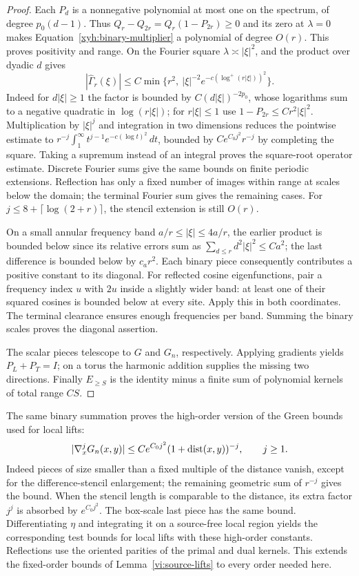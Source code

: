 \begin{proof}
Each $P_d$ is a nonnegative polynomial at most one on the spectrum, of
degree $p_0(d-1)$. Thus $Q_r-Q_{2r}=Q_r(1-P_{2r})\ge0$ and its zero
at $\lambda=0$ makes Equation~\eqref{xyh:binary-multiplier} a polynomial
of degree $O(r)$. This proves positivity and range. On the Fourier square
$\lambda\asymp|\xi|^2$, and the product over dyadic $d$ gives
\[
 |\widehat\Gamma_r(\xi)|\le
 C\min\{r^2,\ |\xi|^{-2}
       e^{-c(\log^+(r|\xi|))^2}\}.
\]
Indeed for $d|\xi|\ge1$ the factor is bounded by
$C(d|\xi|)^{-2p_0}$, whose logarithms sum to a negative quadratic in
$\log(r|\xi|)$; for $r|\xi|\le1$ use
$1-P_{2r}\le Cr^2|\xi|^2$. Multiplication by $|\xi|^j$ and integration
in two dimensions reduces the pointwise estimate to
$r^{-j}\int_1^\infty t^{j-1}e^{-c(\log t)^2}\,dt$, bounded by
$C e^{C_0j^2}r^{-j}$ by completing the square. Taking a supremum instead
of an integral proves the square-root operator estimate. Discrete Fourier
sums give the same bounds on finite periodic extensions. Reflection has
only a fixed number of images within range at scales below the domain;
the terminal Fourier sum gives the remaining cases. For
$j\le8+\lceil\log(2+r)\rceil$, the stencil extension is still $O(r)$.

On a small annular frequency band $a/r\le |\xi|\le4a/r$, the earlier
product is bounded below since its relative errors sum as
$\sum_{d\le r}d^2|\xi|^2\le C a^2$; the last difference is bounded
below by $c_a r^2$. Each binary piece consequently contributes a positive
constant to its diagonal. For reflected cosine eigenfunctions, pair a
frequency index $u$ with $2u$ inside a slightly wider band: at least one
of their squared cosines is bounded below at every site. Apply this in
both coordinates. The terminal clearance ensures enough frequencies per
band. Summing the binary scales proves the diagonal assertion.

The scalar pieces telescope to $G$ and $G_n$, respectively. Applying
gradients yields $P_L+P_T=I$; on a torus the harmonic addition supplies
the missing two directions. Finally $E_{\ge S}$ is the identity minus
a finite sum of polynomial kernels of total range $CS$.
\end{proof}

The same binary summation proves the high-order version of the Green
bounds used for local lifts:
\begin{equation}\label{xyh:green-high}
 |\nabla_x^jG_n(x,y)|\le C e^{C_0j^2}
             (1+\operatorname{dist}(x,y))^{-j},\qquad j\ge1.
\end{equation}
Indeed pieces of size smaller than a fixed multiple of the distance
vanish, except for the difference-stencil enlargement; the remaining
geometric sum of $r^{-j}$ gives the bound. When the stencil length is
comparable to the distance, its extra factor $j^j$ is absorbed by
$e^{C_0j^2}$. The box-scale last piece has the same bound. Differentiating
$\eta$ and integrating it on a source-free local region yields the
corresponding test bounds for local lifts with these high-order
constants. Reflections use the oriented parities of the primal and dual
kernels. This extends the fixed-order bounds of
Lemma~\ref{vi:source-lifts} to every order needed here.

